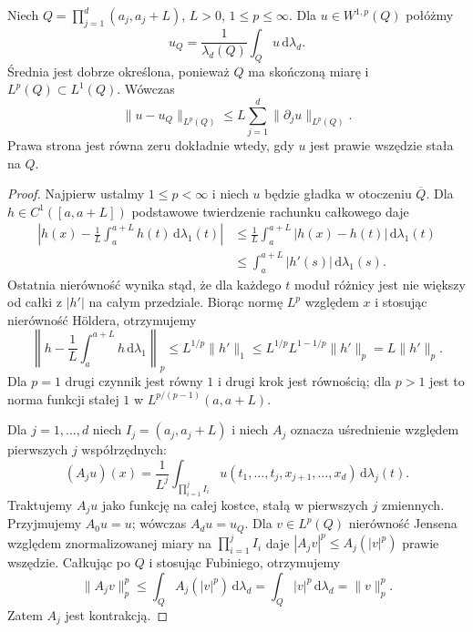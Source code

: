 \begin{twierdzenie}
\label{thm:pde9-cube-Poincare}
Niech $Q=\prod_{j=1}^d(a_j,a_j+L)$, $L>0$,
$1\le p\le\infty$. Dla $u\in W^{1,p}(Q)$ połóżmy
\[
 u_Q=\frac1{\lambda_d(Q)}\int_Q u\,\mathrm d\lambda_d.
\]
Średnia jest dobrze określona, ponieważ $Q$ ma skończoną
miarę i $L^p(Q)\subset L^1(Q)$.
Wówczas
\[
 \|u-u_Q\|_{L^p(Q)}
 \le L\sum_{j=1}^d\|\partial_j u\|_{L^p(Q)}.
\]
Prawa strona jest równa zeru dokładnie wtedy,
gdy $u$ jest prawie wszędzie stała na $Q$.
\end{twierdzenie}
\begin{proof}
Najpierw ustalmy $1\le p<\infty$ i niech $u$
będzie gładka w otoczeniu $\overline Q$.
Dla $h\in C^1([a,a+L])$ podstawowe twierdzenie
rachunku całkowego daje
\[
 \begin{aligned}
 \left|h(x)-\frac1L\int_a^{a+L}h(t)\,\mathrm d\lambda_1(t)\right|
 &\le\frac1L\int_a^{a+L}|h(x)-h(t)|\,\mathrm d\lambda_1(t)\\
 &\le\int_a^{a+L}|h'(s)|\,\mathrm d\lambda_1(s).
 \end{aligned}
\]
Ostatnia nierówność wynika stąd, że dla każdego $t$
moduł różnicy jest nie większy od całki z $|h'|$
na całym przedziale. Biorąc normę $L^p$ względem $x$
i stosując nierówność Höldera, otrzymujemy
\[
 \left\|h-\frac1L\int_a^{a+L}h\,\mathrm d\lambda_1\right\|_p
 \le L^{1/p}\|h'\|_1
 \le L^{1/p}L^{1-1/p}\|h'\|_p
 = L\|h'\|_p.
\]
Dla $p=1$ drugi czynnik jest równy $1$ i drugi
krok jest równością; dla $p>1$ jest to norma
funkcji stałej $1$ w $L^{p/(p-1)}(a,a+L)$.

Dla $j=1,\ldots,d$ niech $I_j=(a_j,a_j+L)$ i
niech $A_j$ oznacza uśrednienie względem pierwszych
$j$ współrzędnych:
\[
 (A_j u)(x)=\frac1{L^j}
 \int_{\prod_{i=1}^j I_i}u(t_1,\ldots,t_j,x_{j+1},\ldots,x_d)
 \,\mathrm d\lambda_j(t).
\]
Traktujemy $A_j u$ jako funkcję na całej kostce,
stałą w pierwszych $j$ zmiennych. Przyjmujemy $A_0u=u$;
wówczas $A_du=u_Q$. Dla $v\in L^p(Q)$
nierówność Jensena względem znormalizowanej miary
na $\prod_{i=1}^j I_i$ daje $|A_jv|^p\le A_j(|v|^p)$
prawie wszędzie. Całkując po $Q$ i stosując Fubiniego,
otrzymujemy
\[
 \|A_jv\|_p^p\le\int_Q A_j(|v|^p)\,\mathrm d\lambda_d
 =\int_Q|v|^p\,\mathrm d\lambda_d=\|v\|_p^p.
\]
Zatem $A_j$ jest kontrakcją.


\end{proof}
